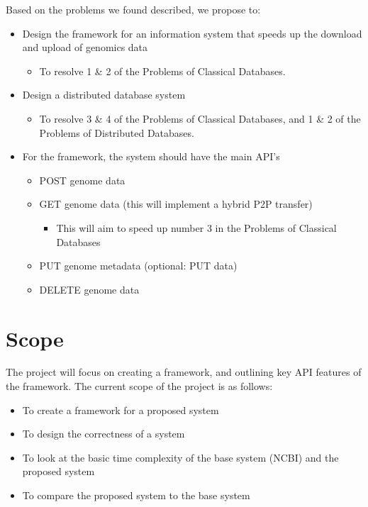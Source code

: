 \documentclass[acmsmall]{acmart}
\begin{document}
Based on the problems we found described, we propose to:

\begin{itemize}
    \item Design the framework for an information system that speeds up the download and upload of genomics data
    \begin{itemize} 
        \item To resolve 1 \& 2 of the Problems of Classical Databases. 
    \end{itemize}
    \item  Design a distributed database system
    \begin{itemize}
        \item To resolve 3 \& 4 of the Problems of Classical Databases, and 1 \& 2 of the Problems of Distributed Databases. 
    \end{itemize}
\end{itemize}

\begin{itemize}
    \item For the framework, the system should have the main API’s 
    \begin{itemize}
        \item POST genome data
        \item GET genome data (this will implement a hybrid P2P transfer)
        \begin{itemize}
            \item This will aim to speed up number 3 in the Problems of Classical Databases
        \end{itemize}
        \item PUT genome metadata (optional: PUT data)
        \item DELETE genome data
    \end{itemize}
\end{itemize}


\section{Scope}

The project will focus on creating a framework, and outlining key API features of the framework. The current scope of the project is as follows:

\begin{itemize}
    \item To create a framework for a proposed system
    \item To design the correctness of a system
    \item To look at the basic time complexity of the base system (NCBI) and the proposed system
    \item To compare the proposed system to the base system

\end{itemize}
\end{document}
